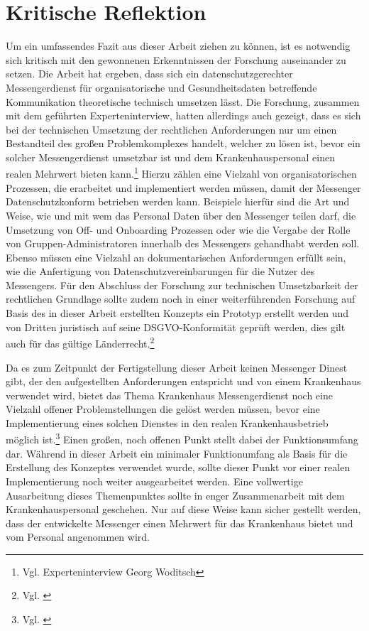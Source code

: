 \section{Kritische Reflektion}\label{chapter:kr}
Um ein umfassendes Fazit aus dieser Arbeit ziehen zu können, ist es notwendig sich kritisch mit den gewonnenen Erkenntnissen der Forschung auseinander zu setzen. Die Arbeit hat ergeben, dass sich ein datenschutzgerechter Messengerdienst für organisatorische und Gesundheitsdaten betreffende Kommunikation theoretische technisch umsetzen lässt. Die Forschung, zusammen mit dem geführten Experteninterview, hatten allerdings auch gezeigt, dass es sich bei der technischen Umsetzung der rechtlichen Anforderungen nur um einen Bestandteil des großen Problemkomplexes handelt, welcher zu lösen ist, bevor ein solcher Messengerdienst umsetzbar ist und dem Krankenhauspersonal einen realen Mehrwert bieten kann.\footnote{Vgl. Experteninterview Georg Woditsch} Hierzu zählen eine Vielzahl von organisatorischen Prozessen, die erarbeitet und implementiert werden müssen, damit der Messenger Datenschutzkonform betrieben werden kann. Beispiele hierfür sind die Art und Weise, wie und mit wem das Personal Daten über den Messenger teilen darf, die Umsetzung von Off- und Onboarding Prozessen oder wie die Vergabe der Rolle von Gruppen-Administratoren innerhalb des Messengers gehandhabt werden soll. Ebenso müssen eine Vielzahl an dokumentarischen Anforderungen erfüllt sein, wie die Anfertigung von Datenschutzvereinbarungen für die Nutzer des Messengers.
Für den Abschluss der Forschung zur technischen Umsetzbarkeit der rechtlichen Grundlage sollte zudem noch in einer weiterführenden Forschung auf Basis des in dieser Arbeit erstellten Konzepts ein Prototyp erstellt werden und von Dritten juristisch auf seine DSGVO-Konformität geprüft werden, dies gilt auch für das gültige Länderrecht.\footnote{Vgl. \cite[S. 8 ff.]{Bundesverband-Gesundheits-IT-e.V.2016}}

Da es zum Zeitpunkt der Fertigstellung dieser Arbeit keinen Messenger Dinest gibt, der den aufgestellten Anforderungen entspricht und von einem Krankenhaus verwendet wird, bietet das Thema Krankenhaus Messengerdienst noch eine Vielzahl offener Problemstellungen die gelöst werden müssen, bevor eine Implementierung eines solchen Dienstes in den realen Krankenhausbetrieb möglich ist.\footnote{Vgl. \cite[S. 1 ff.]{Datenschutzkonferenz2019}}
Einen großen, noch offenen Punkt stellt dabei der Funktionsumfang dar. Während in dieser Arbeit ein minimaler Funktionumfang als Basis für die Erstellung des Konzeptes verwendet wurde, sollte dieser Punkt vor einer realen Implementierung noch weiter ausgearbeitet werden. Eine vollwertige Ausarbeitung dieses Themenpunktes sollte in enger Zusammenarbeit mit dem Krankenhauspersonal geschehen. Nur auf diese Weise kann sicher gestellt werden, dass der entwickelte Messenger einen Mehrwert für das Krankenhaus bietet und vom Personal angenommen wird.

